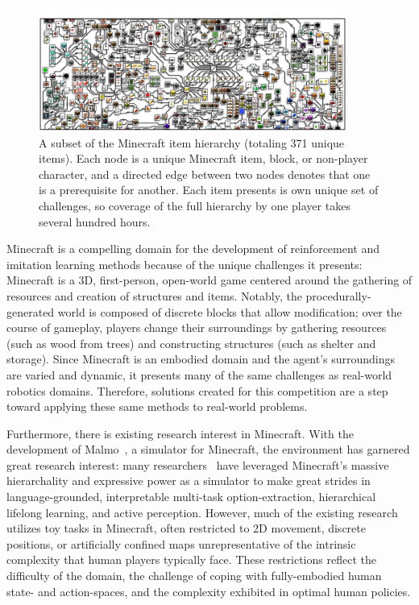 \begin{figure}
    \begin{center}
        \includegraphics[width=0.9\textwidth]{./assets/item_hierarchy_final.png}
        \caption{\small{A subset of the Minecraft item hierarchy (totaling 371
        unique items). Each node is a unique Minecraft item, block, or non-player character, and a directed edge between two nodes denotes that
        one is a prerequisite for another. Each item presents is own unique
        set of challenges, so coverage of the full hierarchy by one player
        takes several hundred hours.}}
        \label{fig:hierarchicality}
    \end{center}
    \vspace{-19pt}
\end{figure}

Minecraft is a compelling domain for the development of reinforcement and imitation learning methods because of the unique challenges it presents: Minecraft is a 3D, first-person, open-world game centered around the gathering of resources and creation of structures and items. 
Notably, the procedurally-generated world is composed of discrete blocks that allow modification; over the course of gameplay, players change their surroundings by gathering resources (such as wood from trees) and constructing structures (such as shelter and storage).
Since Minecraft is an embodied domain and the agent's surroundings are varied and dynamic, it presents many of the same challenges as real-world robotics domains. 
Therefore, solutions created for this competition are a step toward applying these same methods to real-world problems.

Furthermore, there is existing research interest in Minecraft. 
With the development of Malmo~\cite{johnson2016malmo}, a simulator for Minecraft, the environment has garnered great research interest:
many researchers~\cite{oh2016control,shu2017hierarchical,tessler2017deep} have leveraged Minecraft's massive hierarchality and expressive power as a simulator to make great strides in language-grounded, interpretable multi-task option-extraction, hierarchical lifelong learning, and active perception. 
However, much of the existing research utilizes toy tasks in Minecraft, often restricted to 2D movement, discrete positions, or artificially confined maps unrepresentative of the intrinsic complexity that human players typically face. 
These restrictions reflect the difficulty of the domain, the challenge of coping with fully-embodied human state- and action-spaces, and the complexity exhibited in optimal human policies. 

